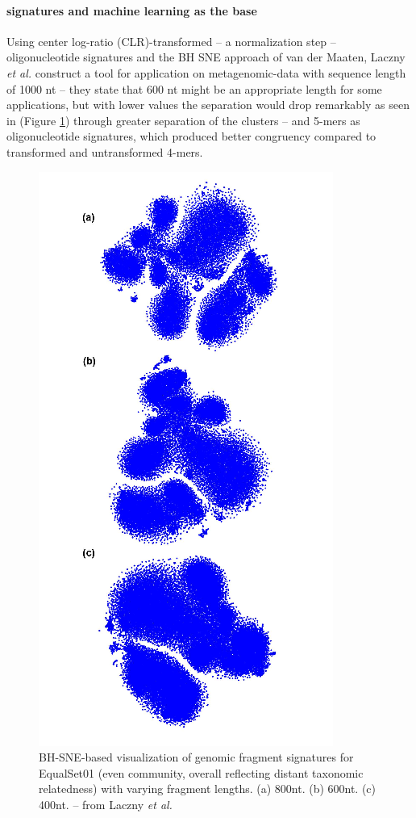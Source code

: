 \documentclass[twocolumn]{bmcart}%
\begin{document}
\paragraph*{signatures and machine learning as the base}
Using center log-ratio (CLR)-transformed -- a normalization step -- oligonucleotide signatures and the BH SNE approach of van der Maaten, Laczny \textit{et al.} construct a tool for application on metagenomic-data with sequence length of 1000 nt -- they state that 600 nt might be an appropriate length for some applications, but with lower values the separation would drop remarkably as seen in (Figure  \ref{img:seperation}) through greater separation of the clusters -- and 5-mers as oligonucleotide signatures, which produced better congruency compared to transformed and untransformed 4-mers.
\begin{figure}
	\centering
	\includegraphics[width=.6\linewidth]{bilder/seperation.png}
	\caption{BH-SNE-based visualization of genomic fragment signatures for
		EqualSet01 (even community, overall reflecting distant taxonomic relatedness) with varying
		fragment lengths.
		(a) 800nt.  (b) 600nt.  (c) 400nt. -- from Laczny \textit{et al.}\cite{Laczny2014}}
	\label{img:seperation}
\end{figure}
\end{document}
